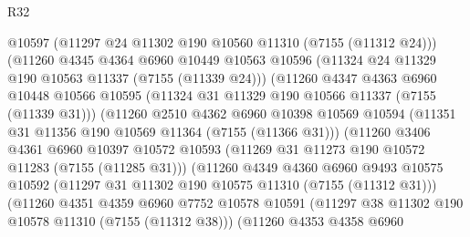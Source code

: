 \begin{lexlean}{R32}
\begin{coremodule}
                            @10597
                            (@11297 @24 @11302 @190 @10560 @11310 (@7155 (@11312 @24)))
                            (@11260
                              @4345
                              @4364
                              @6960
                              @10449
                              @10563
                              @10596
                              (@11324 @24 @11329 @190 @10563 @11337 (@7155 (@11339 @24)))
                              (@11260
                                @4347
                                @4363
                                @6960
                                @10448
                                @10566
                                @10595
                                (@11324 @31 @11329 @190 @10566 @11337 (@7155 (@11339 @31)))
                                (@11260
                                  @2510
                                  @4362
                                  @6960
                                  @10398
                                  @10569
                                  @10594
                                  (@11351 @31 @11356 @190 @10569 @11364 (@7155 (@11366 @31)))
                                  (@11260
                                    @3406
                                    @4361
                                    @6960
                                    @10397
                                    @10572
                                    @10593
                                    (@11269 @31 @11273 @190 @10572 @11283 (@7155 (@11285 @31)))
                                    (@11260
                                      @4349
                                      @4360
                                      @6960
                                      @9493
                                      @10575
                                      @10592
                                      (@11297 @31 @11302 @190 @10575 @11310 (@7155 (@11312 @31)))
                                      (@11260
                                        @4351
                                        @4359
                                        @6960
                                        @7752
                                        @10578
                                        @10591
                                        (@11297 @38 @11302 @190 @10578 @11310 (@7155 (@11312 @38)))
                                        (@11260
                                          @4353
                                          @4358
                                          @6960

\end{coremodule}
\end{lexlean}
